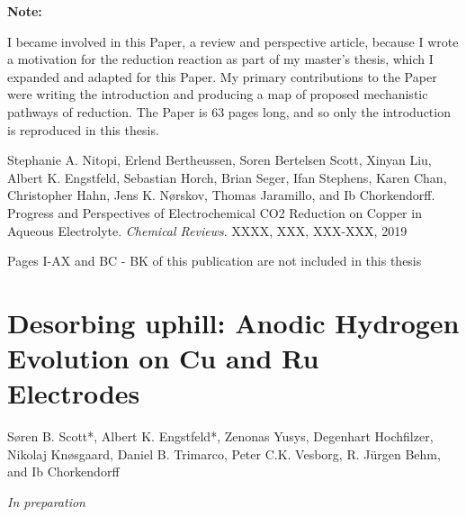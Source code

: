 		\textbf{Note:}
		
		I became involved in this Paper, a review and perspective article, because I wrote a motivation for the  reduction reaction as part of my master's thesis, which I expanded and adapted for this Paper. My primary contributions to the Paper were writing the introduction and producing a map of proposed mechanistic pathways of  reduction. The Paper is 63 pages long, and so only the introduction is reproduced in this thesis.	
		
		
		
		\clearpage
		\vspace{5cm}
		
		
		{
			\hspace{0pt}
			\vfill
			Stephanie A. Nitopi, Erlend Bertheussen, Soren Bertelsen Scott, Xinyan Liu, Albert K. Engstfeld, Sebastian Horch, Brian Seger, Ifan Stephens, Karen Chan, Christopher Hahn, Jens K. Nørskov, Thomas Jaramillo, and Ib Chorkendorff. Progress and Perspectives of Electrochemical CO2 Reduction on Copper in Aqueous Electrolyte. \textit{Chemical Reviews}. XXXX, XXX, XXX-XXX, 2019
			
			\vspace{1cm}
			
			\centering\Large
			Pages I-AX and BC - BK of this publication are not included in this thesis
			\vfill
			\hspace{0pt}
		}
		\clearpage
		
		
		


	
		\clearpage
		\section[In Preparation - Desorbing uphill: Anodic Hydrogen Evolution on Cu and Ru Electrodes]{Desorbing uphill: Anodic Hydrogen Evolution on Cu and Ru Electrodes}\label{Scott_Engstfeld2019}
		
		Søren B. Scott*, Albert K. Engstfeld*, Zenonas Yusys, Degenhart Hochfilzer, Nikolaj Knøsgaard, Daniel B. Trimarco, Peter C.K. Vesborg, R. Jürgen Behm, and Ib Chorkendorff
		
		\textit{In preparation}
		
		
		
